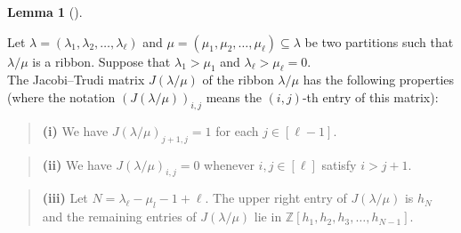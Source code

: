 \documentclass[numbers=enddot,12pt,final,onecolumn,notitlepage]{scrartcl}%
\theoremstyle{definition}
\newtheorem{lem}[theo]{Lemma}
\newenvironment{lemma}[1][]
{\begin{lem}[#1]\begin{leftbar}}
{\end{leftbar}\end{lem}}
\newtheorem{defi}[theo]{Definition}
\newenvironment{definition}[1][]
{\begin{defi}[#1]\begin{leftbar}}
{\end{leftbar}\end{defi}}
\newtheorem{exam}[theo]{Example}
\newenvironment{example}[1][]
{\begin{exam}[#1]\begin{leftbar}}
{\end{leftbar}\end{exam}}
\newenvironment{statement}{\begin{quote}}{\end{quote}}
\newcommand{\tup}[1]{\left( #1 \right)}
\renewcommand{\leq}{\leqslant}
\theoremstyle{plainsl}
\begin{document}









\begin{lemma}
\label{lemma.Hessenberg}
Let $\lambda= (\lambda_1, \lambda_2, \ldots, \lambda_{\ell})$  and $\mu= (\mu_1, \mu_2, \ldots, \mu_{\ell}) \subseteq \lambda$ be two partitions such that $\lambda/\mu$ is a ribbon. 
Suppose that $\lambda_1> \mu_1$ and $\lambda_\ell > \mu_\ell = 0$.\\
 
The Jacobi--Trudi matrix $J(\lambda/\mu)$ of the ribbon $\lambda/\mu$ has the following properties
(where the notation $\tup{J(\lambda/\mu)}_{i,j}$ means the $\tup{i,j}$-th entry of this matrix):

\begin{statement}
\textbf{(i)} We have $J(\lambda/\mu)_{j+1,j}=1$ for each $j \in [\ell-1]$.
\end{statement}
 
\begin{statement}
\textbf{(ii)} We have $J(\lambda/\mu)_{i,j}=0$ whenever
$i, j \in [\ell]$ satisfy $i > j+1$.
\end{statement}

\begin{statement}
\textbf{(iii)} Let $N= \lambda_\ell -\mu_l-1+\ell$. The upper right entry of $J(\lambda/\mu)$ is $h_N$ and the remaining entries of $J(\lambda/\mu)$ lie in $\mathbb{Z}\left[  h_{1},h_{2},h_{3},\ldots, h_{N-1}\right]$.
\end{statement}
\end{lemma}
\end{document}
